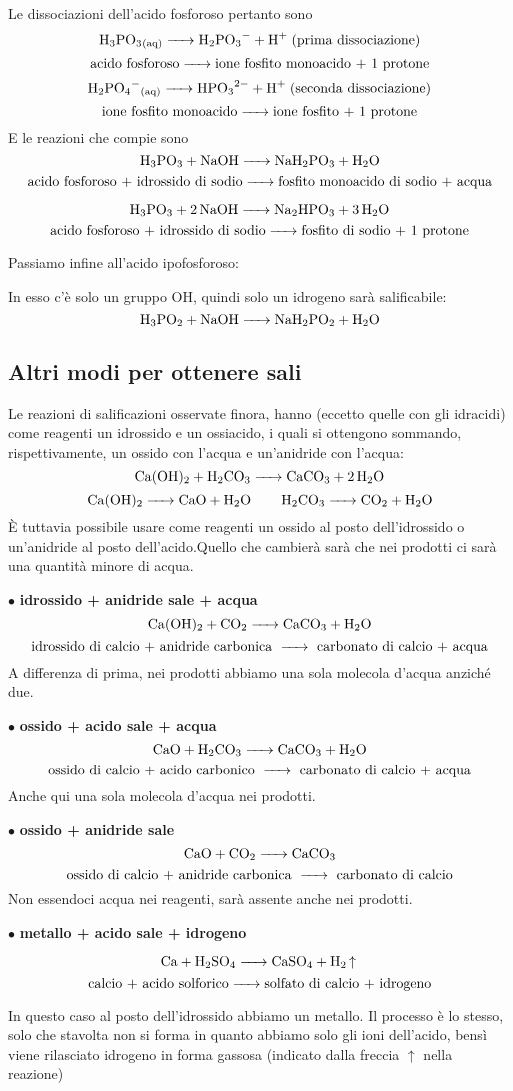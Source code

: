 Le dissociazioni dell'acido fosforoso pertanto sono
$$\ce{H_3PO_3_{(aq)} -> H_2PO_3- + H+}\; \text{(prima dissociazione)}$$
$$\text{acido fosforoso}\ce{->}\text{ione fosfito monoacido + 1 protone}$$
$$\ce{H_2PO_4^-_{(aq)} -> HPO_3^{2-} + H+}\; \text{(seconda dissociazione)}$$
$$\text{ione fosfito monoacido}\ce{->}\text{ione fosfito + 1 protone}$$
E le reazioni che compie sono
$$\ce{H_3PO_3 + NaOH -> NaH_2PO_3 + H_2O}$$
$$\text{acido fosforoso + idrossido di sodio}\ce{->}\text{fosfito monoacido di sodio + acqua}$$

$$\ce{H_3PO_3 + 2 NaOH -> Na_2HPO_3 + 3 H_2O}$$
$$\text{acido fosforoso + idrossido di sodio}\ce{->}\text{fosfito di sodio + 1 protone}$$

Passiamo infine all'acido ipofosforoso:


In esso c'è solo un gruppo OH, quindi solo un idrogeno sarà salificabile:
$$\ce{H_3PO_2 + NaOH -> NaH_2PO_2 + H_2O}$$
\subsection{Altri modi per ottenere sali}
Le reazioni di salificazioni osservate finora, hanno (eccetto quelle con gli idracidi) come reagenti un idrossido e un ossiacido, i quali si ottengono sommando, rispettivamente, un ossido con l'acqua e un'anidride con l'acqua:
$$\ce{Ca(OH)_2 + H_2CO_3 -> CaCO_3 + 2 H_2O}$$
$$\ce{Ca(OH)_2 -> CaO + H2O \qquad H_2CO_3 -> CO_2 + H_2O}$$
È tuttavia possibile usare come reagenti un ossido al posto dell'idrossido  o un'anidride al posto dell'acido.Quello che cambierà sarà che nei prodotti ci sarà una quantità minore di acqua.


$\bullet$ \textbf{ idrossido + anidride \ce{->} sale + acqua}
$$\ce{Ca(OH)_2 + CO_2 -> CaCO_3 + H_2O}$$
$$\text{idrossido di calcio + anidride carbonica \ce{->} carbonato di calcio + acqua}$$
A differenza di prima, nei prodotti abbiamo una sola molecola d'acqua anziché due.


$\bullet$ \textbf{ ossido + acido \ce{->} sale + acqua}
$$\ce{CaO + H_2CO_3 -> CaCO_3 + H_2O}$$
$$\text{ossido di calcio + acido carbonico \ce{->} carbonato di calcio + acqua}$$
Anche qui una sola molecola d'acqua nei prodotti.


$\bullet$ \textbf{ ossido + anidride \ce{->} sale}
$$\ce{CaO + CO_2 -> CaCO_3}$$
$$\text{ossido di calcio + anidride carbonica \ce{->} carbonato di calcio}$$
Non essendoci acqua nei reagenti, sarà assente anche nei prodotti.


$\bullet$ \textbf{ metallo + acido \ce{->} sale + idrogeno}

$$\ce{Ca + H_2SO_4 -> CaSO_4 + H_2 ^}$$
$$\text{calcio + acido solforico\ce{->}solfato di calcio + idrogeno}$$

In questo caso al posto dell'idrossido abbiamo un metallo. Il processo è lo stesso, solo che stavolta non si forma  in quanto abbiamo solo gli ioni  dell'acido, bensì viene rilasciato idrogeno in forma gassosa (indicato dalla freccia $\uparrow$ nella reazione)